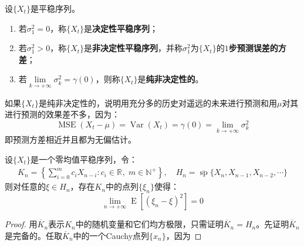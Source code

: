 \begin{definition}
	设$\{X_t\}$是平稳序列。
	\begin{enumerate}
		\item 若$\sigma_1^2=0$，称$\{X_t\}$是\textbf{决定性平稳序列}；
		\item 若$\sigma_1^2>0$，称$\{X_t\}$是\textbf{非决定性平稳序列}，并称$\sigma_1^2$为$\{X_t\}$的\textbf{$1$步预测误差的方差}；
		\item 若$\lim\limits_{k\to+\infty}\sigma_k^2=\gamma(0)$，则称$\{X_t\}$是\textbf{纯非决定性的}。
	\end{enumerate}
\end{definition}
\begin{note}
	如果$\{X_t\}$是纯非决定性的，说明用充分多的历史对遥远的未来进行预测和用$\mu$对其进行预测的效果差不多，因为：
	\begin{equation*}
		\operatorname{MSE}(X_t-\mu)=\operatorname{Var}(X_t)=\gamma(0)=\lim_{k\to+\infty}\sigma_k^2
	\end{equation*}
	即预测方差相近并且都为无偏估计。
\end{note}

\begin{lemma}
	设$\{X_t\}$是一个零均值平稳序列，令：
	\begin{gather*}
		K_n=\left\{\sum_{i=0}^{m}c_iX_{n-i}:c_i\in\mathbb{R}^{},\;m\in\mathbb{N}^+\right\},\quad
		H_n=\overline{\operatorname{sp}}\{X_n,X_{n-1},X_{n-2},\cdots\}
	\end{gather*}
	则对任意的$\xi\in H_n$，存在$K_n$中的点列$\{\xi_n\}$使得：
	\begin{equation*}
		\lim_{n\to+\infty}\operatorname{E}[(\xi_n-\xi)^2]=0
	\end{equation*}
\end{lemma}
\begin{proof}
	用$\overline{K}_n$表示$K_n$中的随机变量和它们均方极限，只需证明$\overline{K}_n=H_n$。先证明$\overline{K}_n$是完备的。任取$\overline{K}_n$中的一个Cauchy点列$\{x_n\}$，因为
\end{proof}
